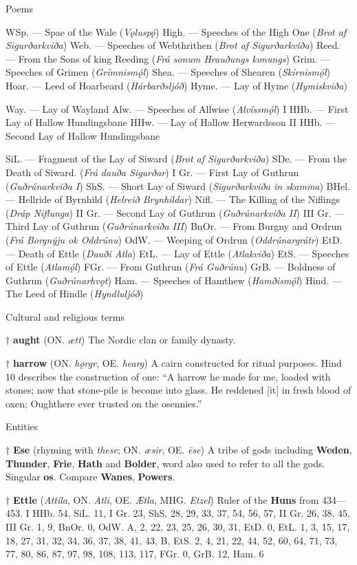 Poems

WSp. — Spae of the Wale (\emph{Vǫluspǫ́})
High. — Speeches of the High One (\emph{Brot af Sigurðarkviða})
Web. — Speeches of Webthrithen (\emph{Brot af Sigurðarkviða})
Reed. — From the Sons of king Reeding (\emph{Frá sonum Hrauðungs konungs})
Grim. — Speeches of Grimen (\emph{Grímnismǫ́l})
Shea. — Speeches of Shearen (\emph{Skírnismǫ́l})
Hoar. — Leed of Hoarbeard (\emph{Hárbarðsljóð})
Hyme. — Lay of Hyme (\emph{Hymiskviða})

Way. — Lay of Wayland
Alw. — Speeches of Allwise (\emph{Alvíssmǫ́l})
I HHb. — First Lay of Hallow Hundingsbane
HHw. — Lay of Hallow Herwardsson
II HHb. — Second Lay of Hallow Hundingsbane

SiL. — Fragment of the Lay of Siward (\emph{Brot af Sigurðarkviða})
SDe. — From the Death of Siward. (\emph{Frá dauða Sigurðar})
I Gr. — First Lay of Guthrun (\emph{Guðrúnarkviða I})
ShS. — Short Lay of Siward (\emph{Sigurðarkviða in skamma})
BHel. — Hellride of Byrnhild (\emph{Helreið Brynhildar})
Nifl. — The Killing of the Niflings (\emph{Dráp Niflunga})
II Gr. — Second Lay of Guthrun (\emph{Guðrúnarkviða II})
III Gr. — Third Lay of Guthrun (\emph{Guðrúnarkviða III})
BnOr. — From Burgny and Ordrun (\emph{Frá Borgnýju ok Oddrúnu})
OdW. — Weeping of Ordrun (\emph{Oddrúnargrátr})
EtD. — Death of Ettle (\emph{Dauði Atla})
EtL. — Lay of Ettle (\emph{Atlakviða})
EtS. — Speeches of Ettle (\emph{Atlamǫ́l})
FGr. — From Guthrun (\emph{Frá Guðrúnu})
GrB. — Boldness of Guthrun (\emph{Guðrúnarhvǫt})
Ham. — Speeches of Hamthew (\emph{Hamðismǫ́l})
Hind. — The Leed of Hindle (\emph{Hyndluljóð})

Cultural and religious terms

† \textbf{aught} (ON. \emph{ætt})
 The Nordic clan or family dynasty.
 
† \textbf{harrow} (ON. \emph{hǫrgr}, OE. \emph{hearg})
 A cairn constructed for ritual purposes. Hind 10 describes the construction of one: “A harrow he made for me, loaded with stones; now that stone-pile is become into glass. He reddened [it] in fresh blood of oxen; Oughthere ever trusted on the osennies.”

Entities

† \textbf{Ese} (rhyming with \emph{these}; ON. \emph{æsir}, OE. \emph{ēse})
 A tribe of gods including \textbf{Weden}, \textbf{Thunder}, \textbf{Frie}, \textbf{Hath} and \textbf{Bolder}, word also used to refer to all the gods. Singular \textbf{os}. Compare \textbf{Wanes}, \textbf{Powers}.

† \textbf{Ettle} (\emph{Attila}, ON. \emph{Atli}, OE. \emph{Ætla}, MHG. \emph{Etzel})
 Ruler of the \textbf{Huns} from 434—453.
 I HHb. 54, SiL. 11, I Gr. 23, ShS. 28, 29, 33, 37, 54, 56, 57, II Gr. 26, 38, 45, III Gr. 1, 9, BnOr. 0, OdW. A, 2, 22, 23, 25, 26, 30, 31, EtD. 0, EtL. 1, 3, 15, 17, 18, 27, 31, 32, 34, 36, 37, 38, 41, 43, B, EtS. 2, 4, 21, 22, 44, 52, 60, 64, 71, 73, 77, 80, 86, 87, 97, 98, 108, 113, 117, FGr. 0, GrB. 12, Ham. 6

